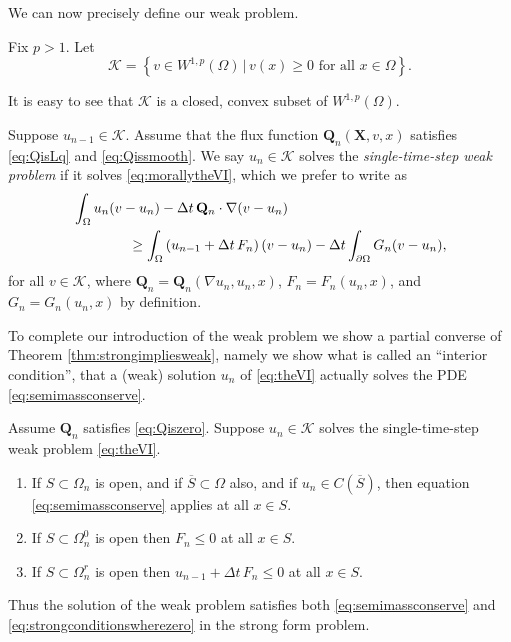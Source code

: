 \documentclass[final,leqno,onefignum,onetabnum]{siamltex1213bueler}
\newcommand\bQ{\mathbf{Q}}
\newcommand\bX{\mathbf{X}}
\renewcommand{\grad}{\nabla}
\begin{document}
\medskip
We can now precisely define our weak problem.

\medskip
\begin{definition}  Fix $p>1$.  Let
    $$\mathcal{K} = \left\{v \in W^{1,p}(\Omega) \,\big|\, v(x) \ge 0 \text{ for all } x \in \Omega\right\}.$$
\end{definition}

It is easy to see that $\mathcal{K}$ is a closed, convex subset of $W^{1,p}(\Omega)$.  

\begin{definition}  Suppose $u_{n-1}\in\mathcal{K}$.  Assume that the flux function $\bQ_n(\bX,v,x)$ satisfies \eqref{eq:QisLq} and \eqref{eq:Qissmooth}.  We say $u_n \in \mathcal{K}$ solves the \emph{single-time-step weak problem} if it solves \eqref{eq:morallytheVI}, which we prefer to write as
\begin{align}
&\int_{\Omega} u_n (v-u_n) - \Delta t\, \bQ_n \cdot \grad(v-u_n)  \label{eq:theVI} \\
  &\qquad\qquad \ge \int_{\Omega} \left(u_{n-1} + \Delta t\, F_n\right) (v-u_n) - \Delta t \int_{\partial \Omega} G_n (v-u_n),  \notag
\end{align}
for all $v \in \mathcal{K}$, where $\bQ_n=\bQ_n(\grad u_n,u_n,x)$, $F_n = F_n(u_n,x)$, and $G_n=G_n(u_n,x)$ by definition.
\end{definition}

To complete our introduction of the weak problem we show a partial converse of Theorem \ref{thm:strongimpliesweak}, namely we show what is called an ``interior condition'', that a (weak) solution $u_n$ of \eqref{eq:theVI} actually solves the PDE \eqref{eq:semimassconserve}.

\medskip
\begin{theorem} \label{thm:weakimpliesstrong}  Assume $\bQ_n$ satisfies \eqref{eq:Qiszero}.  Suppose $u_n\in\mathcal{K}$ solves the single-time-step weak problem \eqref{eq:theVI}.
\renewcommand{\labelenumi}{\emph{(\roman{enumi})}}
\begin{enumerate}
\item If $S \subset \Omega_n$ is open, and if $\overline{S}\subset \Omega$ also, and if $u_n\in C(\overline{S})$, then equation \eqref{eq:semimassconserve} applies at all $x\in S$.
\item If $S \subset \Omega_n^0$ is open then $F_n \le 0$ at all $x\in S$.
\item If $S \subset \Omega_n^r$ is open then $u_{n-1} + \Delta t\,F_n \le 0$ at all $x\in S$.
\end{enumerate}
Thus the solution of the weak problem satisfies both \eqref{eq:semimassconserve} and \eqref{eq:strongconditionswherezero} in the strong form problem.
\end{theorem}
\end{document}
